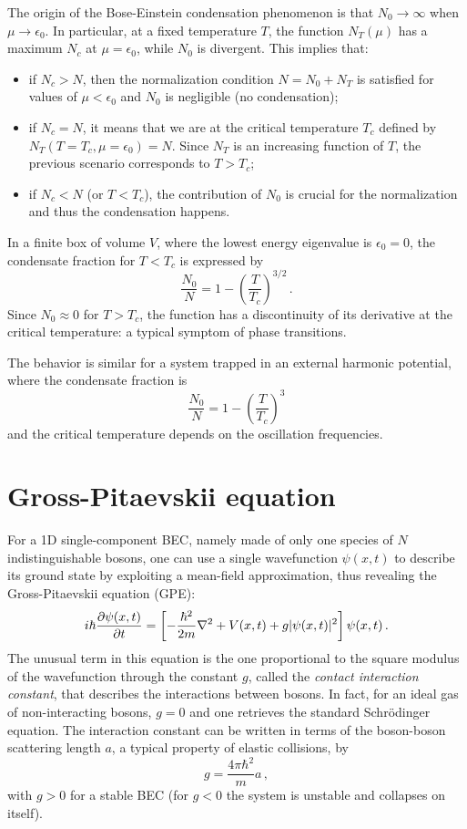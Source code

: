 The origin of the Bose-Einstein condensation phenomenon is that $N_0 \to \infty$ when $\mu \to \epsilon_0$. In particular, at a fixed temperature $T$, the function $N_T(\mu)$ has a maximum $N_c$ at $\mu = \epsilon_0$, while $N_0$ is divergent. This implies that:
\begin{itemize}
    \item if $N_c > N$, then the normalization condition $N = N_0 + N_T$ is satisfied for values of $\mu < \epsilon_0$ and $N_0$ is negligible (no condensation);
    \item if $N_c = N$, it means that we are at the critical temperature $T_c$ defined by $N_T(T = T_c, \mu = \epsilon_0) = N$. Since $N_T$ is an increasing function of $T$, the previous scenario corresponds to $T > T_c$;
    \item if $N_c < N$ (or $T < T_c$), the contribution of $N_0$ is crucial for the normalization and thus the condensation happens.
\end{itemize}
In a finite box of volume $V$, where the lowest energy eigenvalue is $\epsilon_0 = 0$, the condensate fraction for $T < T_c$ is expressed by
\begin{equation*}
    \frac{N_0}{N} = 1-\left(\frac{T}{T_c}\right)^{3/2}\, .
\end{equation*}
Since $N_0 \approx 0$ for $T > T_c$, the function has a discontinuity of its derivative at the critical temperature: a typical symptom of phase transitions.

The behavior is similar for a system trapped in an external harmonic potential, where the condensate fraction is
\begin{equation*}
    \frac{N_0}{N} = 1-\left(\frac{T}{T_c}\right)^3
\end{equation*}
and the critical temperature depends on the oscillation frequencies.

\section{Gross-Pitaevskii equation}
For a 1D single-component BEC, namely made of only one species of $N$ indistinguishable bosons, one can use a single wavefunction $\psi(x,t)$ to describe its ground state by exploiting a mean-field approximation, thus revealing the Gross-Pitaevskii equation (GPE):
\begin{equation}
    i\hbar \pdv{\psi(x,t)}{t} = \left[ 
        -\frac{\hbar^2}{2m}\nabla^2 + V(x,t) + g|\psi(x,t)|^2
    \right] \psi(x,t)\, .
\end{equation}
The unusual term in this equation is the one proportional to the square modulus of the wavefunction through the constant $g$, called the \textit{contact interaction constant}, that describes the interactions between bosons. In fact, for an ideal gas of non-interacting bosons, $g = 0$ and one retrieves the standard Schrödinger equation. The interaction constant can be written in terms of the boson-boson scattering length $a$, a typical property of elastic collisions, by
\[
    g = \frac{4\pi\hbar^2}{m}a\, ,
\]
with $g > 0$ for a stable BEC (for $g < 0$ the system is unstable and collapses on itself).

